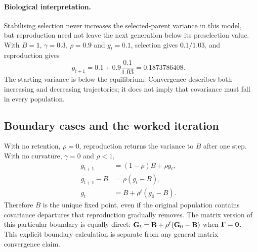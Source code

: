 \paragraph{Biological interpretation.}
Stabilising selection never increases the selected-parent variance in this
model, but reproduction need not leave the next generation below its
preselection value. With $B=1$, $\gamma=0.3$, $\rho=0.9$ and
$g_t=0.1$, selection gives $0.1/1.03$, and reproduction gives
\begin{equation}
  g_{t+1}=0.1+0.9\frac{0.1}{1.03}
           =0.1873786408.
  \label{inheritance:increase-example}
\end{equation}
The starting variance is below the equilibrium. Convergence describes
both increasing and decreasing trajectories; it does not imply that
covariance must fall in every population.

\subsection{Boundary cases and the worked iteration}
\label{inheritance:scalar-boundaries}

With no retention, $\rho=0$, reproduction returns the variance to $B$
after one step. With no curvature, $\gamma=0$ and $\rho<1$,
\begin{align}
  g_{t+1}&=(1-\rho)B+\rho g_t,\\
  g_{t+1}-B&=\rho(g_t-B),\\
  g_t&=B+\rho^t(g_0-B).
  \label{inheritance:zero-curvature}
\end{align}
Therefore $B$ is the unique fixed point, even if the original population
contains covariance departures that reproduction gradually removes.
The matrix version of this particular boundary is equally direct:
$\mathbf{G}_t=\mathbf{B}+\rho^t(\mathbf{G}_0-\mathbf{B})$ when
$\boldsymbol{\Gamma}=\mathbf{0}$. This explicit boundary calculation is separate from
any general matrix convergence claim.

